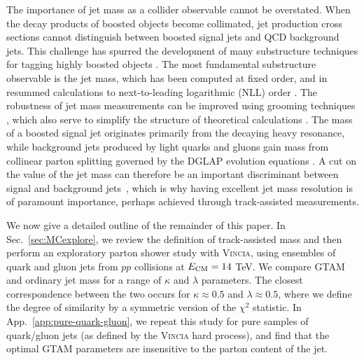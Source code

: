 \documentclass[letterpaper,11pt]{article}
\newcommand{\Sec}[1]{Sec.~\ref{#1}}
\newcommand{\App}[1]{App.~\ref{#1}}
\begin{document}
The importance of jet mass as a collider observable cannot be overstated.
%
When the decay products of boosted objects become collimated, jet production cross sections cannot distinguish between boosted signal jets and QCD background jets. 
%
This challenge has spurred the development of many substructure techniques for tagging highly boosted objects
\cite{Butterworth:2008iy,Kaplan:2008ie,Almeida:2008yp,Ellis:2009su,Ellis:2009me,Krohn:2009th,Chekanov:2010vc,Soper:2010xk,Plehn:2010st,Thaler:2010tr,Cui:2010km,Hook:2011cq,Jankowiak:2011qa,Thaler:2011gf,Jouttenus:2013hs,Larkoski:2013eya,Dasgupta:2013ihk,Anders:2013oga,Larkoski:2014wba,Kasieczka:2015jma,Thaler:2015xaa,Moult:2016cvt,Komiske:2017aww}.
%
The most fundamental substructure observable is the jet mass, which has been computed at fixed order, and in resummed calculations to next-to-leading logarithmic (NLL) order \cite{Catani:1991bd,Li:2011hy,Dasgupta:2012hg,Chien:2012ur,Liu:2014oog}. 
%
The robustness of jet mass measurements can be improved using grooming techniques \cite{Butterworth:2008iy,Ellis:2009su,Ellis:2009me,Krohn:2009th,Dasgupta:2013ihk,Larkoski:2014wba}, which also serve to simplify the structure of theoretical calculations \cite{Frye:2016okc,Frye:2016aiz,Marzani:2017mva,Marzani:2017kqd}.
%
The mass of a boosted signal jet originates primarily from the decaying heavy resonance, while background jets produced by light quarks and gluons gain mass from collinear parton splitting governed by the DGLAP evolution equations \cite{Gribov:1972ri,Lipatov:1974qm,Dokshitzer:1977sg,Altarelli:1977zs}. 
%
A cut on the value of the jet mass can therefore be an important discriminant between signal and background jets~\cite{Khachatryan:2014vla,Aad:2015rpa}, which is why having excellent jet mass resolution is of paramount importance, perhaps achieved through track-assisted measurements.


We now give a detailed outline of the remainder of this paper.
%
In \Sec{sec:MCexplore}, we review the definition of track-assisted mass and then perform an exploratory parton shower study with \textsc{Vincia}, using ensembles of quark and gluon jets from $pp$ collisions at $E_{\rm CM} = 14$ TeV. 
%
We compare GTAM and ordinary jet mass for a range of $\kappa$ and $\lambda$ parameters.
%
The closest correspondence between the two occurs for $\kappa \approx 0.5$ and $\lambda \approx 0.5$, where we define the degree of similarity by a symmetric version of the $\chi^2$ statistic.
%
In \App{app:pure-quark-gluon}, we repeat this study for pure samples of quark/gluon jets (as defined by the \textsc{Vincia} hard process), and find that the optimal GTAM parameters are insensitive to the parton content of the jet.
\end{document}
